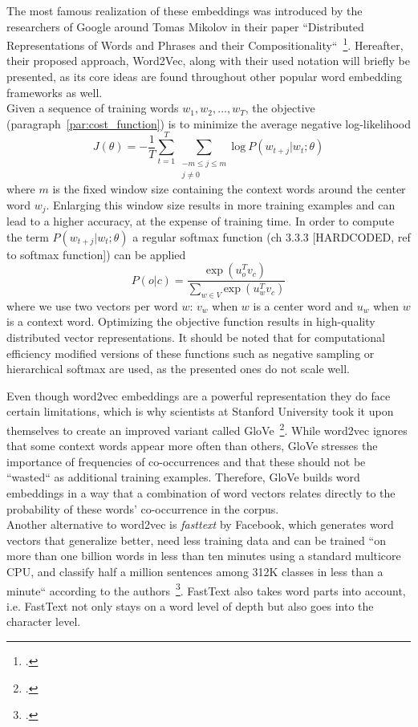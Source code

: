 The most famous realization of these embeddings was introduced by the researchers of Google around Tomas Mikolov in their paper “Distributed Representations of Words and Phrases and their Compositionality“~\footcite{DBLP:journals/corr/MikolovSCCD13}. Hereafter, their proposed approach, Word2Vec, along with their used notation will briefly be presented, as its core ideas are found throughout other popular word embedding frameworks as well. \\
Given a sequence of training words $ w_1, w_2, \dots, w_T $, the objective (paragraph~\ref{par:cost_function}) is to minimize the average negative log-likelihood
\begin{equation}
	\label{eqn:skip_gram_objective_function}
	J(\theta) = - \frac{1}{T} \sum_{t=1}^{T} \sum_{\substack{-m \leq j \leq m \\ j \neq 0}} \text{log} \ P(w_{t+j} | w_t; \theta)
\end{equation}
where $ m $ is the fixed window size containing the context words around the center word $ w_j $. Enlarging this window size results in more training examples and can lead to a higher accuracy, at the expense of training time. In order to compute the term $ P(w_{t+j} | w_t; \theta) $ a regular softmax function (ch 3.3.3 [HARDCODED, ref to softmax function]) can be applied
\begin{equation}
	\label{eqn:skip_gram_conditional_probability}
	P(o | c) = \frac{\text{exp} \ (u_{o}^{T} v_{c})}{\sum_{w \in V} \text{exp} \ (u_{w}^{T} v_c)}
\end{equation}
where we use two vectors per word $ w $: $ v_w $ when $ w $ is a center word and $ u_w $ when $ w $ is a context word. Optimizing the objective function results in high-quality distributed vector representations. It should be noted that for computational efficiency modified versions of these functions such as negative sampling or hierarchical softmax are used, as the presented ones do not scale well.

Even though word2vec embeddings are a powerful representation they do face certain limitations, which is why scientists at Stanford University took it upon themselves to create an improved variant called GloVe~\footcite{pennington-etal-2014-glove}. While word2vec ignores that some context words appear more often than others, GloVe stresses the importance of frequencies of co-occurrences and that these should not be “wasted“ as additional training examples. Therefore, GloVe builds word embeddings in a way that a combination of word vectors relates directly to the probability of these words' co-occurrence in the corpus. \\
Another alternative to word2vec is \textit{fasttext} by Facebook, which generates word vectors that generalize better, need less training data and can be trained “on more than one billion words in less than ten minutes using a standard multicore CPU, and classify half a million sentences among 312K classes in less than a minute“ according to the authors~\footcite{DBLP:journals/corr/JoulinGBM16}. FastText also takes word parts into account, i.e. FastText not only stays on a word level of depth but also goes into the character level.
